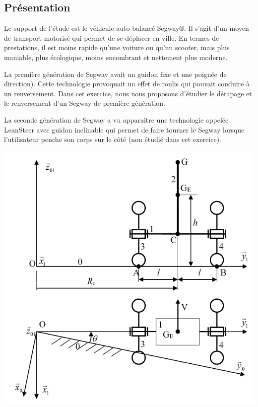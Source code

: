 \documentclass[10pt,fleqn]{article} %
\begin{document}

\vspace{4.5cm}
\pagestyle{fancy}
\thispagestyle{plain}


\def\columnseprulecolor{\color{ocre}}
\setlength{\columnseprule}{0.4pt} 

\ifprof
\else
\begin{multicols}{2}
\fi

\section*{Présentation}
\ifprof
\else

Le support de l’étude est le véhicule auto balancé Segway®. Il s’agit d’un moyen de transport motorisé qui permet de se déplacer en ville. En termes de prestations, il est moins rapide qu’une voiture ou qu’un scooter, mais plus maniable, plus écologique, moins encombrant et nettement plus moderne.

	La première génération de Segway avait un guidon fixe et une poignée de direction). Cette technologie provoquait un effet de roulis qui pouvait conduire à un renversement. Dans cet exercice, nous nous proposons d’étudier le dérapage et le renversement d’un Segway de première génération.
	
	La seconde génération de Segway a vu apparaître une technologie appelée LeanSteer avec guidon inclinable qui permet de faire tourner le Segway lorsque l'utilisateur penche son corps sur le côté (non étudié dans cet exercice).

\begin{center}
\includegraphics[width=\linewidth]{images/fig_02}
\end{center}



\end{multicols}
\end{document}
